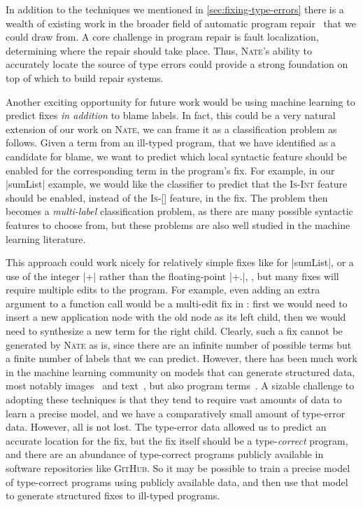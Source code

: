 In addition to the techniques we mentioned in
\autoref{sec:fixing-type-errors} there is a wealth of existing work in
the broader field of automatic program repair~\citep[see][\S~4, for a
survey]{Le_Goues2013-ag} that we could draw from.
%
A core challenge in program repair is fault localization, \ie
determining where the repair should take place.
%
Thus, \textsc{Nate}'s ability to accurately locate the source of type
errors could provide a strong foundation on top of which to build repair
systems.

Another exciting opportunity for future work would be using machine
learning to predict fixes \emph{in addition} to blame labels.
%
In fact, this could be a very natural extension of our work on
\textsc{Nate}, we can frame it as a classification problem as follows.
%
Given a term from an ill-typed program, that we have identified as a
candidate for blame, we want to predict which local syntactic feature
should be enabled for the corresponding term in the program's fix.
%
For example, in our |sumList| example, we would like the classifier to
predict that the \textsc{Is-Int} feature should be enabled, instead of
the \textsc{Is-[]} feature, in the fix.
%
The problem then becomes a \emph{multi-label} classification problem, as
there are many possible syntactic features to choose from, but these
problems are also well studied in the machine learning literature.

This approach could work nicely for relatively simple fixes like for
|sumList|, or a use of the integer |+| rather than the floating-point
|+.|, \etc, but many fixes will require multiple edits to the program.
%
For example, even adding an extra argument to a function call would be a
multi-edit fix in \ocaml: first we would need to insert a new
application node with the old node as its left child, then we would need
to synthesize a new term for the right child.
%
Clearly, such a fix cannot be generated by \textsc{Nate} as is, since
there are an infinite number of possible terms but a finite number of
labels that we can predict.
%
However, there has been much work in the machine learning community on
models that can generate structured data, most notably
images~\citep{Gregor2015-ra} and text~\citep{Bahdanau2014-gt}, but also
program terms~\citep{Raychev2016-xk,Raychev2014-jv}.
%
A sizable challenge to adopting these techniques is that they tend to
require vast amounts of data to learn a precise model, and we have a
comparatively small amount of type-error data.
%
However, all is not lost.
%
The type-error data allowed us to predict an accurate location for the
fix, but the fix itself should be a type-\emph{correct} program, and
there are an abundance of type-correct programs publicly available in
software repositories like \textsc{GitHub}.
%
So it may be possible to train a precise model of type-correct programs
using publicly available data, and then use that model to generate
structured fixes to ill-typed programs.

